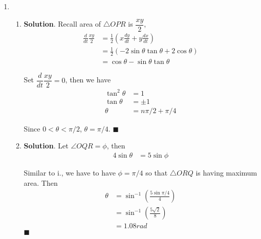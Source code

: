 \documentclass[12pt]{article}
\newenvironment*{sol}{\par \textbf{Solution}.}{\hfill$\blacksquare$}
\begin{document}
\begin{enumerate}
\begin{enumerate}
\begin{enumerate}
\begin{sol}
                    \begin{align*}
                        \frac{dPQ}{dt}|_{\theta=\pi/6}&=\frac{dy}{dt}|_{\theta=\pi/6}+\frac{dz}{dt}|_{\theta=\pi/6}\\
                        &=-\frac{1}{2}\tan{\pi/3}-\frac{2\sin{\pi/6}}{\sqrt{25-16\sin^2{\pi/6}}}\\
                        &=-\frac{\sqrt{3}}{2}-\frac{1}{\sqrt{25-4}}\\
                        &=-\frac{\sqrt{3}}{2}-\frac{\sqrt{21}}{21}
                    \end{align*}
                \end{sol}
            \end{enumerate}
            \item \begin{enumerate}
                \item \begin{sol}
                    Recall area of $\triangle OPR$ is $\dfrac{xy}{2}$,\begin{align*}
                        \frac{d}{dt}\frac{xy}{2}&=\frac{1}{2}(x\frac{dy}{dt}+y\frac{dx}{dt})\\
                        &=\frac{1}{2}(-2\sin{\theta}\tan{\theta}+2\cos{\theta})\\
                        &=\cos{\theta}-\sin{\theta}\tan{\theta}
                    \end{align*}

                    Set $\dfrac{d}{dt}\dfrac{xy}{2}=0$, then we have \begin{align*}
                        \tan^2{\theta}&=1\\
                        \tan{\theta}&=\pm1\\
                        \theta&=n\pi/2+\pi/4
                    \end{align*}

                    Since $0<\theta<\pi/2$, $\theta=\pi/4$.
                \end{sol}
                \item \begin{sol}
                    Let $\angle OQR=\phi$, then \begin{align*}
                        4\sin{\theta}&=5\sin{\phi}
                    \end{align*}

                    Similar to i., we have to have $\phi=\pi/4$ so that $\triangle ORQ$ is having maximum area. Then \begin{align*}
                        \theta&=\sin^{-1}(\frac{5\sin{\pi/4}}{4})\\
                        &=\sin^{-1}(\frac{5\sqrt{2}}{8})\\
                        &=1.08 rad
                    \end{align*}
                \end{sol}
            \end{enumerate}
        \end{enumerate}
    \end{enumerate}
\end{document}
